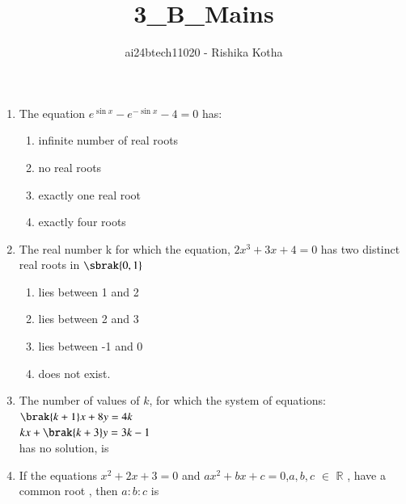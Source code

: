 \documentclass[journal,12pt,onecolumn]{IEEEtran}
\theoremstyle{remark}
\begin{document}

\vspace{3cm}

\title{3\_B\_Mains}
\author{ai24btech11020 - Rishika Kotha}

\maketitle
\bigskip       
\renewcommand{\thefigure}{\theenumi}
\renewcommand{\thetable}{\theenumi}

\begin{enumerate}[start=24]
\item The equation $e^{\sin x}-e^{-\sin x}-4=0$ has:
	\hfill {}
	\begin{enumerate}[label=\alph*.]
	\item  infinite number of real roots
	\item  no real roots
	\item  exactly one real root
	\item  exactly four roots
	\end{enumerate}
\item The real number k for which the equation, $2x^3+3x+4=0$ has two distinct real roots in $\sbrak{0,1}$
        \hfill {}
	\begin{enumerate}[label=\alph*.]
        \item  lies between 1 and 2
	\item  lies between 2 and 3
	\item  lies between -1 and 0
	\item  does not exist.
	\end{enumerate}
\item The number of values of $k$, for which the system of equations:\\
	$\brak{k+1}x+8y=4k$\\
	$kx+\brak{k+3}y=3k-1$\\
has no solution, is\hfill {}
        \begin{enumerate}[label=\alph*.]
	\begin{multicols}{2}
	\item   infinite
	\item     1
	\item     2
	\item     3
	\end{multicols}
	\end{enumerate}
\item If the equations $x^2+2x+3=0$ and $ax^2+bx+c=0$,$a,b,c$ $\in$ $\mathbb{R}$ , have a common root , then $a:b:c$ is

\end{enumerate}
\end{document}

